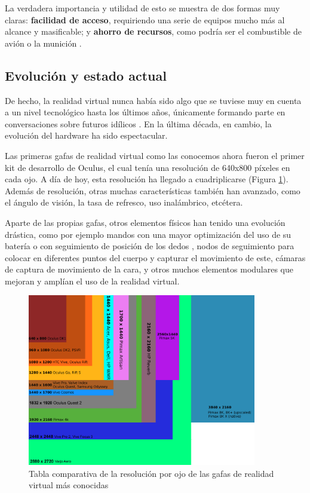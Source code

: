 La verdadera importancia y utilidad de esto se muestra de dos formas muy claras: \textbf{facilidad de acceso}, requiriendo una serie de equipos mucho más al alcance y masificable; y \textbf{ahorro de recursos}, como podría ser el combustible de avión o la munición \cite{costeffective_vr}.

\subsection{Evolución y estado actual}

De hecho, la realidad virtual nunca había sido algo que se tuviese muy en cuenta a un nivel tecnológico hasta los últimos años, únicamente formando parte en conversaciones sobre futuros idílicos \cite{innovation_vr}. En la última década, en cambio, la evolución del hardware ha sido espectacular.

Las primeras gafas de realidad virtual como las conocemos ahora fueron el primer kit de desarrollo de Oculus, el cual tenía una resolución de 640x800 píxeles en cada ojo. A día de hoy, esta resolución ha llegado a cuadriplicarse (Figura \ref{fig:vr_resolution}). Además de resolución, otras muchas características también han avanzado, como el ángulo de visión, la tasa de refresco, uso inalámbrico, etcétera.

Aparte de las propias gafas, otros elementos físicos han tenido una evolución drástica, como por ejemplo mandos con una mayor optimización del uso de su batería o con seguimiento de posición de los dedos \cite{fingertracking}, nodos de seguimiento para colocar en diferentes puntos del cuerpo y capturar el movimiento de este, cámaras de captura de movimiento de la cara, y otros muchos elementos modulares que mejoran y amplían el uso de la realidad virtual.

\begin{figure}[H]
	\centering
	\includegraphics[width=10cm]{imagenes/vr_resolution}
	\caption{Tabla comparativa de la resolución por ojo de las gafas de realidad virtual más conocidas}
	\label{fig:vr_resolution}
\end{figure}

